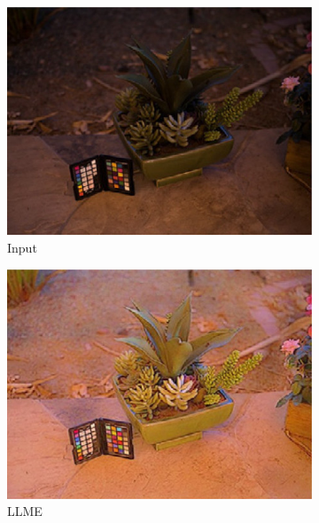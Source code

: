 \documentclass[letterpaper,10pt]{article}
\begin{document}
\begin{figure}[htbp]
				\begin{subfigure}{0.24\textwidth}
					\includegraphics[width=\linewidth]{picture/LLIE/Input2}
					\captionsetup{font=scriptsize}
					\caption{Input}
					\label{fig: Input2}
				\end{subfigure}
				\begin{subfigure}{0.24\textwidth}
					\includegraphics[width=\linewidth]{picture/LLIE/LLME2}
					\captionsetup{font=scriptsize}
					\caption{LLME}
					\label{fig: LLME2}
				\end{subfigure}
				\begin{subfigure}{0.24\textwidth}

\end{subfigure}
\end{figure}
\end{document}
